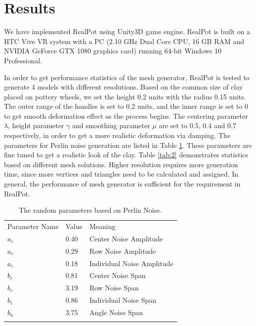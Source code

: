 \documentclass{svjour3}                     %
\begin{document}

\section{Results}
\label{sec:5}

We have implemented RealPot using Unity3D \cite{website:unity} game engine. RealPot is built on a HTC Vive VR system with a PC (2.10 GHz Dual Core CPU, 16 GB RAM and NVIDIA GeForce GTX 1080 graphics card) running 64-bit Windows 10 Professional.

In order to get performance statistics of the mesh generator, RealPot is tested to generate 4 models with different resolutions.
Based on the common size of clay placed on pottery wheels, we set the height 0.2 units with the radius 0.15 units.
The outer range of the handles is set to 0.2 units, and the inner range is set to 0 to get smooth deformation effect as the process begins. The centering parameter $\lambda$, height parameter $\gamma$ and smoothing parameter $\mu$ are set to 0.5, 0.4 and 0.7 respectively, in order to get a more realistic deformation via damping. The parameters for Perlin noise generation are listed in Table \ref{tab:1}. These parameters are fine tuned to get a realistic look of the clay.
Table \ref{tab:2} demonstrates statistics based on different mesh solutions. Higher resolution requires more generation time, since more vertices and triangles need to be calculated and assigned. In general, the performance of mesh generator is sufficient for the requirement in RealPot.

\begin{table}
\caption{The random parameters based on Perlin Noise.}
\label{tab:1}       %
\begin{tabular}{lll}
\hline\noalign{\smallskip}
Parameter Name & Value & Meaning  \\
\noalign{\smallskip}\hline\noalign{\smallskip}
$a_{c}$ & 0.40 & Center Noise Amplitude \\
$a_{r}$ & 0.29 & Row Noise Amplitude \\
$a_{i}$ & 0.18 & Individual Noise Amplitude \\
$b_{c}$ & 0.81 & Center Noise Span \\
$b_{r}$ & 3.19 & Row Noise Span \\
$b_{i}$ & 0.86 & Individual Noise Span \\
$b_{a}$ & 3.75 & Angle Noise Span \\
\noalign{\smallskip}\hline
\end{tabular}
\end{table}
\end{document}
